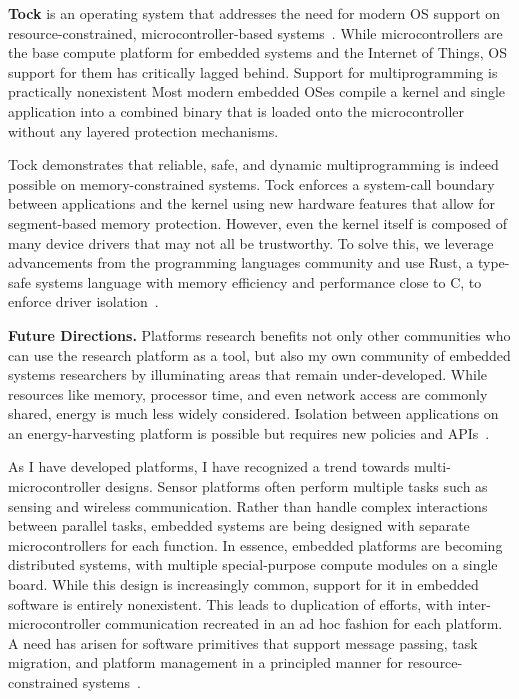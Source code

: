 \documentclass[11pt]{article} %
\begin{document}
\textbf{Tock} is an operating system that addresses the need for modern OS support on
resource-constrained, microcontroller-based systems~\cite{levy17multiprogramming}.
While microcontrollers are the base compute platform for
embedded systems and the Internet of Things, OS support for them has critically
lagged behind.
Support for multiprogramming is practically nonexistent Most modern embedded
OSes compile a kernel and single application into a combined binary that is
loaded onto the microcontroller without any layered protection mechanisms.

Tock demonstrates that reliable, safe, and dynamic multiprogramming is indeed
possible on memory-constrained systems. Tock enforces a system-call boundary between
applications and the kernel using new hardware features that allow for
segment-based memory protection. However, even the kernel itself is composed of
many device drivers that may not all be trustworthy. To solve this, we leverage
advancements from the programming languages community and use Rust, a type-safe
systems language with memory efficiency and performance close to C, to enforce
driver isolation~\cite{levy17rustkernel}.

\textbf{Future Directions.} Platforms research benefits not only other communities who
can use the research platform as a tool, but also my own community of embedded
systems researchers by illuminating areas that remain under-developed. While
resources like memory, processor time, and even network access are commonly
shared, energy is much less widely considered. Isolation between applications
on an energy-harvesting platform is possible but requires new policies and
APIs~\cite{adkins17energy}.



As I have developed platforms, I have recognized a trend towards
multi-microcontroller designs.
%
Sensor platforms often perform multiple tasks such as sensing and wireless
communication. Rather than handle complex interactions between parallel tasks,
embedded systems are being designed with separate microcontrollers for each
function. In essence, embedded platforms are becoming distributed systems, with
multiple special-purpose compute modules on a single board.
While this design is increasingly common, support for it in embedded software
is entirely nonexistent. This leads to duplication of efforts, with
inter-microcontroller communication recreated in an ad hoc fashion for each
platform.
%
A need has arisen for
software primitives that support message passing, task migration, and platform
management in a principled manner for resource-constrained systems~\cite{ghena19distributed}.
\end{document}
